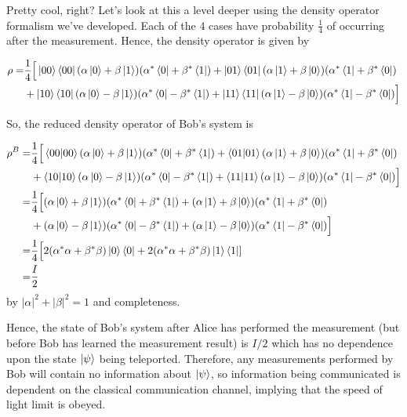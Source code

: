 \documentclass[main.tex]{subfiles}
\begin{document}
\begin{subappendices}
Pretty cool, right? Let's look at this a level deeper using the density operator formalism we've developed. Each of the 4 cases have probability $\frac{1}{4}$ of occurring after the measurement. Hence, the density operator is given by

\begin{align*}
	\rho =& \frac{1}{4}\Big[ \ket{00}\bra{00} (\alpha\ket{0} + \beta\ket{1})(\alpha^*\bra{0} + \beta^*\bra{1}) + \ket{01}\bra{01}(\alpha\ket{1} + \beta \ket{0})(\alpha^*\bra{1} + \beta^* \bra{0}) \\
	&+ \ket{10}\bra{10}(\alpha\ket{0} - \beta\ket{1})(\alpha^*\bra{0} - \beta^*\bra{1}) + \ket{11}\bra{11}(\alpha\ket{1} - \beta\ket{0})(\alpha^*\bra{1} - \beta^*\bra{0}) \Big]
\end{align*}

So, the reduced density operator of Bob's system is

\begin{align*}
	\rho^B =& \frac{1}{4}\Big[ \bra{00}\ket{00} (\alpha\ket{0} + \beta\ket{1})(\alpha^*\bra{0} + \beta^*\bra{1}) + \bra{01}\ket{01}(\alpha\ket{1} + \beta \ket{0})(\alpha^*\bra{1} + \beta^* \bra{0}) \\
	&+ \bra{10}\ket{10}(\alpha\ket{0} - \beta\ket{1})(\alpha^*\bra{0} - \beta^*\bra{1}) + \bra{11}\ket{11}(\alpha\ket{1} - \beta\ket{0})(\alpha^*\bra{1} - \beta^*\bra{0}) \Big] \\
	=& \frac{1}{4}\Big[(\alpha\ket{0} + \beta\ket{1})(\alpha^*\bra{0} + \beta^*\bra{1}) + (\alpha\ket{1} + \beta \ket{0})(\alpha^*\bra{1} + \beta^* \bra{0}) \\
	&+ (\alpha\ket{0} - \beta\ket{1})(\alpha^*\bra{0} - \beta^*\bra{1}) + (\alpha\ket{1} - \beta\ket{0})(\alpha^*\bra{1} - \beta^*\bra{0}) \Big] \\
	=& \frac{1}{4}\Big[2(\alpha^*\alpha + \beta^*\beta)\ket{0}\bra{0} + 2(\alpha^*\alpha + \beta^*\beta)\ket{1}\bra{1}] \\
	=& \frac{I}{2}
\end{align*}
by $|\alpha|^2 + |\beta|^2 = 1$ and completeness.

Hence, the state of Bob's system after Alice has performed the measurement (but before Bob has learned the measurement result) is $I/2$ which has no dependence upon the state $\ket{\psi}$ being teleported. Therefore, any measurements performed by Bob will contain no information about $\ket{\psi}$, so information being communicated is dependent on the classical communication channel, implying that the speed of light limit is obeyed.


\end{subappendices}
\end{document}
